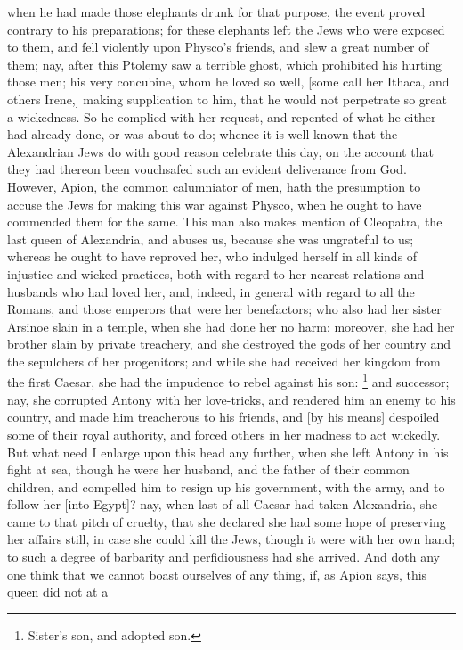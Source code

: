 when he had made those elephants drunk for that purpose, the event proved
contrary to his preparations; for these elephants left the Jews who were
exposed to them, and fell violently upon Physco's friends, and slew a
great number of them; nay, after this Ptolemy saw a terrible ghost, which
prohibited his hurting those men; his very concubine, whom he loved so
well, [some call her Ithaca, and others Irene,] making supplication to
him, that he would not perpetrate so great a wickedness. So he complied
with her request, and repented of what he either had already done, or was
about to do; whence it is well known that the Alexandrian Jews do with
good reason celebrate this day, on the account that they had thereon been
vouchsafed such an evident deliverance from God. However, Apion, the
common calumniator of men, hath the presumption to accuse the Jews for
making this war against Physco, when he ought to have commended them for
the same. This man also makes mention of Cleopatra, the last queen of
Alexandria, and abuses us, because she was ungrateful to us; whereas he
ought to have reproved her, who indulged herself in all kinds of injustice
and wicked practices, both with regard to her nearest relations and
husbands who had loved her, and, indeed, in general with regard to all the
Romans, and those emperors that were her benefactors; who also had her
sister Arsinoe slain in a temple, when she had done her no harm: moreover,
she had her brother slain by private treachery, and she destroyed the gods
of her country and the sepulchers of her progenitors; and while she had
received her kingdom from the first Caesar, she had the impudence to rebel
against his son: \footnote{Sister's son, and adopted
son.} and successor; nay, she corrupted
Antony with her love-tricks, and rendered him an enemy to his country, and
made him treacherous to his friends, and [by his means] despoiled some of
their royal authority, and forced others in her madness to act wickedly.
But what need I enlarge upon this head any further, when she left Antony
in his fight at sea, though he were her husband, and the father of their
common children, and compelled him to resign up his government, with the
army, and to follow her [into Egypt]? nay, when last of all Caesar had
taken Alexandria, she came to that pitch of cruelty, that she declared she
had some hope of preserving her affairs still, in case she could kill the
Jews, though it were with her own hand; to such a degree of barbarity and
perfidiousness had she arrived. And doth any one think that we cannot
boast ourselves of any thing, if, as Apion says, this queen did not at a
